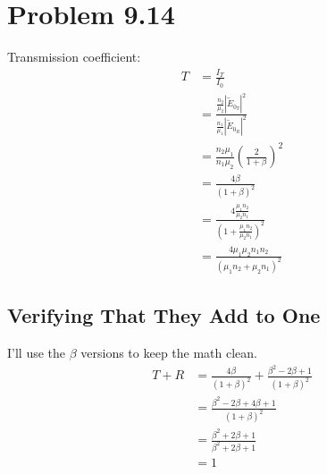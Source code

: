 \documentclass[12pt]{article}
\newcommand{\enterProblemHeader}[1]{
	\rhead{#1}
}
\newenvironment{homeworkProblem}[1]{
    \section{Problem #1}
    \enterProblemHeader{#1}
}{
	\pagebreak
}
\begin{document}
\begin{homeworkProblem}{9.14}
	Transmission coefficient:
	\begin{align*}
		T &= \frac {I_T} {I_0}\\
		&=  \frac { \frac {n_2} {\mu_2} | \tilde E_{0_T} |^2 } { \frac {n_1}
		{\mu_1} | \tilde E_{0_R} |^2 }\\
		&= \frac {n_2 \mu_1} {n_1 \mu_2} \left( \frac 2 {1 + \beta} \right)^2\\
		&= \frac {4 \beta} {(1 + \beta)^2}\\
		&= \frac {4 \frac {\mu_1 n_2} {\mu_2 n_1}} {(1 + \frac {\mu_1 n_2}
		{\mu_2 n_1})^2}\\
		&= \frac {4 \mu_1 \mu_2 n_1 n_2} {(\mu_1 n_2 + \mu_2 n_1)^2}
	\end{align*}

	\subsection{Verifying That They Add to One}

	I'll use the $\beta$ versions to keep the math clean.
	\begin{align*}
		T + R &= \frac {4 \beta} {(1 + \beta)^2} + \frac {\beta^2 - 2 \beta + 1}
		{(1 + \beta)^2}\\
		&= \frac {\beta^2 - 2 \beta + 4 \beta + 1} {(1 + \beta)^2}\\
		&= \frac {\beta^2 + 2 \beta + 1} {\beta^2 + 2 \beta + 1}\\
		&= 1
	\end{align*}

\end{homeworkProblem}
\end{document}
